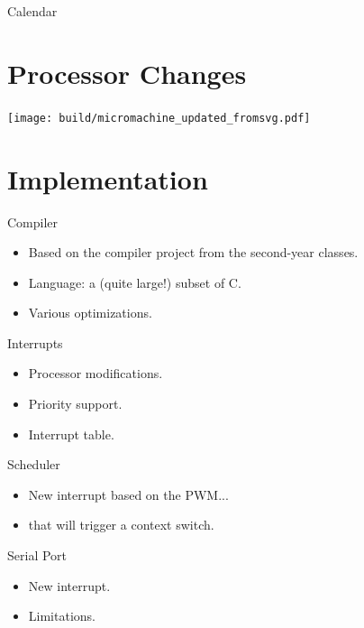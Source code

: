 \documentclass{beamer}
\begin{document}
      \begin{frame}{Calendar}
      \end{frame}

  \section{Processor Changes}
    \begin{landscape}
        \begin{frame}
            \texttt{[image: build/micromachine\_updated\_fromsvg.pdf]}

        \end{frame}
    \end{landscape}

  \section{Implementation}
    \begin{frame}{Compiler}
      \begin{itemize}
        \item Based on the compiler project from the second-year classes.
        \item Language: a (quite large!) subset of C.
        \item Various optimizations.
      \end{itemize}
    \end{frame}

    \begin{frame}{Interrupts}
      \begin{itemize}
        \item Processor modifications.
        \item Priority support.
        \item Interrupt table.
      \end{itemize}
    \end{frame}

    \begin{frame}{Scheduler}
      \begin{itemize}
        \item New interrupt based on the PWM...
        \item that will trigger a context switch.
      \end{itemize}
    \end{frame}

    \begin{frame}{Serial Port}
      \begin{itemize}
        \item New interrupt.
        \item Limitations.
      \end{itemize}
    \end{frame}
\end{document}

